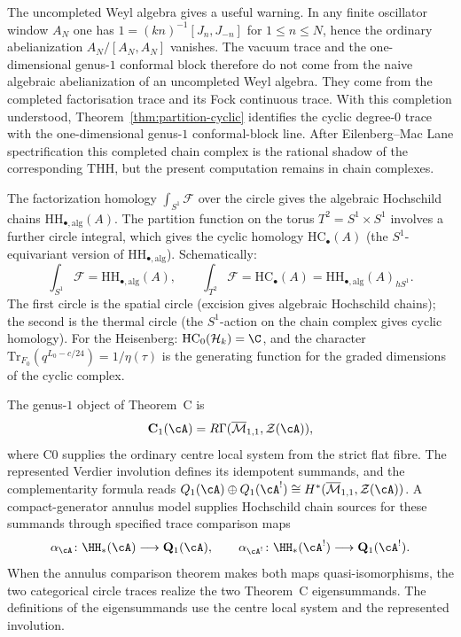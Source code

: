 \begin{example}
The uncompleted Weyl algebra gives a useful warning. In any finite
oscillator window $A_N$ one has
$1=(kn)^{-1}[J_n,J_{-n}]$ for $1\le n\le N$, hence the ordinary
abelianization $A_N/[A_N,A_N]$ vanishes. The vacuum trace and the
one-dimensional genus-$1$ conformal block therefore do not come from
the naive algebraic abelianization of an uncompleted Weyl algebra.
They come from the completed factorisation trace and its Fock
continuous trace. With this completion understood,
Theorem~\ref{thm:partition-cyclic} identifies the cyclic degree-$0$
trace with the one-dimensional genus-$1$ conformal-block line. After
Eilenberg--Mac Lane spectrification this completed chain complex is
the rational shadow of the corresponding $\mathrm{THH}$, but the
present computation remains in chain complexes.
\end{example}

\begin{remark}
\label{rem:annulus-vs-torus}
The factorization homology $\int_{S^1} \mathcal{F}$ over the circle
gives the algebraic Hochschild chains
$\mathrm{HH}_{\bullet,\mathrm{alg}}(A)$. The partition
function on the torus $T^2 = S^1 \times S^1$ involves a further
circle integral, which gives the cyclic homology
$\mathrm{HC}_\bullet(A)$ (the $S^1$-equivariant version of
$\mathrm{HH}_{\bullet,\mathrm{alg}}$). Schematically:
\[
\int_{S^1} \mathcal{F} = \mathrm{HH}_{\bullet,\mathrm{alg}}(A),
\qquad
\int_{T^2} \mathcal{F}
= \mathrm{HC}_\bullet(A)
= \mathrm{HH}_{\bullet,\mathrm{alg}}(A)_{hS^1}.
\]
The first circle is the spatial circle (excision gives algebraic
Hochschild chains); the second is the thermal circle (the
$S^1$-action on the chain complex gives cyclic homology).
For the Heisenberg:
$\mathrm{HC}_0(\mathcal{H}_k) = \C$, and the character
$\mathrm{Tr}_{F_0}(q^{L_0-c/24}) = 1/\eta(\tau)$ is the
generating function for the graded dimensions of the cyclic complex.
\end{remark}

\begin{remark}
\label{rem:annulus-complementarity}
The genus-$1$ object of Theorem~C is
\[
 \mathbf C_1(\cA)
 =R\Gamma(\overline{\mathcal M}_{1,1},\mathcal Z(\cA)),
\]
where C0 supplies the ordinary centre local system from the strict flat
fibre.  The represented Verdier involution defines its idempotent
summands, and the complementarity formula reads
$Q_1(\cA) \oplus Q_1(\cA^!) \cong H^*(\overline{\mathcal{M}}_{1,1},
\mathcal{Z}(\cA))$.
A compact-generator annulus model supplies Hochschild chain sources
for these summands through specified trace comparison maps
\[
 \alpha_{\cA}\colon \HH_*(\cA)\longrightarrow\mathbf Q_1(\cA),
 \qquad
 \alpha_{\cA^!}\colon \HH_*(\cA^!)\longrightarrow\mathbf Q_1(\cA^!).
\]
When the annulus comparison theorem makes both maps
quasi-isomorphisms, the two categorical circle traces realize the two
Theorem~C eigensummands.  The definitions of the eigensummands use
the centre local system and the represented involution.
\end{remark}

